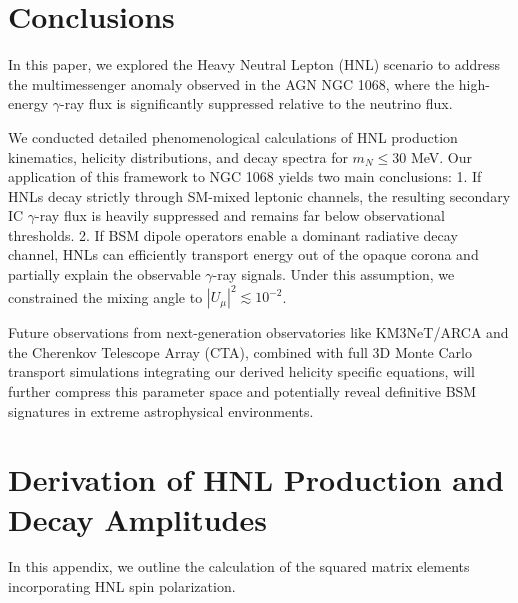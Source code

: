 \documentclass{article}
\begin{document}
\section{Conclusions} \label{sec:conclusion}

In this paper, we explored the Heavy Neutral Lepton (HNL) scenario to address the multimessenger anomaly observed in the AGN NGC 1068, where the high-energy $\gamma$-ray flux is significantly suppressed relative to the neutrino flux. 

We conducted detailed phenomenological calculations of HNL production kinematics, helicity distributions, and decay spectra for $m_N \leq 30$ MeV. Our application of this framework to NGC 1068 yields two main conclusions:
1. If HNLs decay strictly through SM-mixed leptonic channels, the resulting secondary IC $\gamma$-ray flux is heavily suppressed and remains far below observational thresholds.
2. If BSM dipole operators enable a dominant radiative decay channel, HNLs can efficiently transport energy out of the opaque corona and partially explain the observable $\gamma$-ray signals. Under this assumption, we constrained the mixing angle to $|U_\mu|^2 \lesssim 10^{-2}$.

Future observations from next-generation observatories like KM3NeT/ARCA and the Cherenkov Telescope Array (CTA), combined with full 3D Monte Carlo transport simulations integrating our derived helicity specific equations, will further compress this parameter space and potentially reveal definitive BSM signatures in extreme astrophysical environments.


\appendix

\section{Derivation of HNL Production and Decay Amplitudes} \label{sec:appendix}

In this appendix, we outline the calculation of the squared matrix elements incorporating HNL spin polarization.
\end{document}

